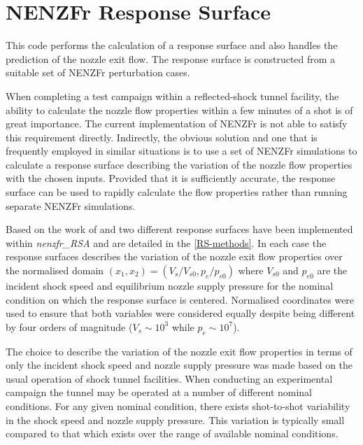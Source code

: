 
\newpage
\section{NENZFr Response Surface}
\label{chapter-response-surface}
This code performs the calculation of a response surface and also handles the prediction of the nozzle exit flow. The response surface is constructed from a suitable set of NENZFr perturbation cases.  

When completing a test campaign within a reflected-shock tunnel facility, the ability to calculate the nozzle flow properties within a few minutes of a shot is of great importance. The current implementation of NENZFr is not able to satisfy this requirement directly. Indirectly, the obvious solution and one that is frequently employed in similar situations is to use a set of NENZFr simulations to calculate a response surface describing the variation of the nozzle flow properties with the chosen inputs. Provided that it is sufficiently accurate, the response surface can be used to rapidly calculate the flow properties rather than running separate NENZFr simulations. 


Based on the work of \cite{Simpson_2001} and \cite{Giunta_2003} two different response surfaces have been implemented within \textit{nenzfr\_RSA} and are detailed in the \cref{RS-methods}. In each case the response surfaces describes the variation of the nozzle exit flow properties over the normalised domain $(x_1, x_2) = (V_s/V_{s0}, p_e/p_{e0})$ where $V_{s0}$ and $p_{e0}$ are the incident shock speed and equilibrium nozzle supply pressure for the nominal condition on which the response surface is centered. Normalised coordinates were used to ensure that both variables were considered equally despite being different by four orders of magnitude ($V_s\sim10^3$ while $p_e\sim10^7$).  

The choice to describe the variation of the nozzle exit flow properties in terms of only the incident shock speed and nozzle supply pressure was made based on the usual operation of shock tunnel facilities. When conducting an experimental campaign the tunnel may be operated at a number of different nominal conditions.  For any given nominal condition, there exists shot-to-shot variability in the shock speed and nozzle supply pressure. This variation is typically small compared to that which exists over the range of available nominal conditions. 

